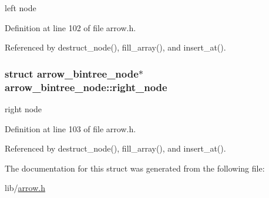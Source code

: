 left node 

Definition at line 102 of file arrow.h.

Referenced by destruct\_\-node(), fill\_\-array(), and insert\_\-at().\hypertarget{structarrow__bintree__node_4875801983f2b0220212951e6c0130af}{
\subsubsection{\setlength{\rightskip}{0pt plus 5cm}struct {\bf arrow\_\-bintree\_\-node}$\ast$ {\bf arrow\_\-bintree\_\-node::right\_\-node}}}
\label{structarrow__bintree__node_4875801983f2b0220212951e6c0130af}


right node 

Definition at line 103 of file arrow.h.

Referenced by destruct\_\-node(), fill\_\-array(), and insert\_\-at().

The documentation for this struct was generated from the following file:\begin{CompactItemize}
\item 
lib/\hyperlink{arrow_8h}{arrow.h}\end{CompactItemize}
